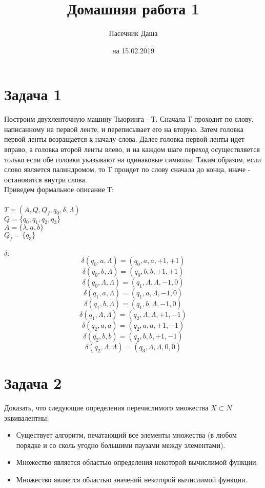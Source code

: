 \documentclass{article}
\title{Домашняя работа 1}
\author{Пасечник Даша}
\date{на 15.02.2019}
\begin{document}
\maketitle

\section*{Задача 1}

Построим двухленточную машину Тьюринга - Т. Сначала Т проходит по слову, написанному на первой ленте, и переписывает его на вторую. Затем головка первой ленты возращается к началу слова. Далее головка первой ленты идет вправо, а головка второй ленты влево, и на каждом шаге переход осуществляется только если обе головки указывают на одинаковые символы. Таким образом, если слово является палиндромом, то Т проидет по слову сначала до конца, иначе - остановится внутри слова. \\Приведем формальное описание Т:\\ \\
$T = \left(A, Q, Q_{f}, q_{0}, \delta, \Lambda\right)$\\
$Q = \lbrace q_0, q_1, q_2, q_3\rbrace$\\
$A = \lbrace \lambda, a, b \rbrace$\\
$Q_f = \lbrace q_3\rbrace$\\
\\
$\delta:$\\
$$\delta\left(q_{0}, a, \Lambda\right)=\left(q_{0}, a, a,+1,+1\right)$$
$$\delta\left(q_{0}, b, \Lambda\right)=\left(q_{0}, b, b, +1,+1\right)$$
$$\delta\left(q_{0}, \Lambda, \Lambda\right)=\left(q_{1}, \Lambda, \Lambda,-1,0\right)$$
$$\delta\left(q_{1}, a, \Lambda\right)=\left(q_{1}, a, \Lambda,-1,0\right)$$
$$\delta\left(q_{1}, b, \Lambda\right)=\left(q_{1}, b, \Lambda,-1,0\right)$$
$$\delta\left(q_{1}, \Lambda, \Lambda\right)=\left(q_{2}, \Lambda, \Lambda, +1,-1\right)$$
$$\delta\left(q_{2}, a, a\right)=\left(q_{2}, a, a,+1,-1\right)$$
$$\delta\left(q_{2}, b, b\right)=\left(q_{2}, b, b,+1,-1\right)$$
$$\delta\left(q_{2}, \Lambda, \Lambda\right)=\left(q_{3}, \Lambda,\Lambda,0,0\right)$$

\section*{Задача 2}

Доказать, что следующие определения перечислимого множества $X \subset {N}$ эквивалентны:
\begin{itemize}
\item Существует алгоритм, печатающий все элементы множества (в любом порядке и со сколь угодно большими паузами между элементами).
\item Множество является областью определения некоторой вычислимой функции.
\item Множество является областью значений некоторой вычислимой функции.
\end{itemize}
\end{document}
